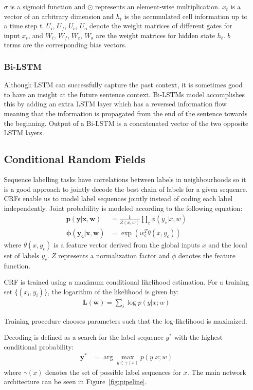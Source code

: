 $\sigma$ is a sigmoid function and $\odot$ represents an element-wise
multiplication. $x_t$ is a vector of an arbitrary dimension and $h_t$ is the
accumulated cell information up to a time step $t$. $U_i$, $U_f$, $U_c$, $U_o$
denote the weight matrices of different gates for input $x_t$, and
$W_i$, $W_f$, $W_c$, $W_o$ are the weight matrices for hidden state $h_t$.
$b$ terms are the corresponding bias vectors.

\subsubsection{Bi-LSTM}
Although LSTM can successfully capture the past context, it is sometimes good
to have an insight at the future sentence context. Bi-LSTMs model accomplishes
this by adding an extra LSTM layer which has a reversed information flow
meaning that the information is propagated from the end of the sentence towards
the beginning. Output of a Bi-LSTM is a concatenated vector of the two opposite
LSTM layers.

\subsection{Conditional Random Fields}
Sequence labelling tasks have correlations between labels in neighbourhoods so
it is a good approach to jointly decode the best chain of labels for a given
sequence. CRFs enable us to model label sequences jointly instead of coding
each label independently. Joint probability is modeled according to the following
equation:
\begin{align*}
    \bm{p(y | x, w)} &= \frac{1}{Z(x, w)} \prod_c \phi(y_c | x, w)\\
    \bm{\phi(y_c | x, w)} &= \exp(w_c^T \theta(x, y_c))
\end{align*}
where $\theta(x, y_c)$ is a feature vector derived from the global inputs $x$
and the local set of labels $y_c$. $Z$ represents a normalization factor and
$\phi$ denotes the feature function. 

CRF is trained using a maximum conditional likelihood estimation. For a
training set $\{(x_i, y_i)\}$, the logarithm of the likelihood is given by:
\begin{align*}
    \bm{L(w)} = \sum_i \log p(y | x; w)
\end{align*}

Training procedure chooses parameters such that the log-likelihood is
maximized.

Decoding is defined as a search for the label sequence $y^*$ with the highest
conditional probability:
\begin{align*}
    \bm{y^*} &= \arg\max\limits_{y \in \gamma(x)} p(y | x; w)
\end{align*}
where $\gamma(x)$ denotes the set of possible label sequences for $x$.
The main network architecture can be seen in Figure~\ref{fig:pipeline}.


